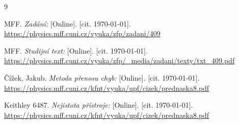 
\begin{thebibliography}{9}

 MFF. \emph{Zadání:} [Online]. [cit. \today]. \newline \url{https://physics.mff.cuni.cz/vyuka/zfp/zadani/409}

 MFF. \emph{Studijní text:} [Online]. [cit. \today]. \newline \url{https://physics.mff.cuni.cz/vyuka/zfp/_media/zadani/texty/txt_409.pdf}

 Čížek, Jakub. \emph{Metoda přenosu chyb:} [Online]. [cit. \today]. \newline \url{https://physics.mff.cuni.cz/kfnt/vyuka/upf/cizek/prednaska8.pdf}

 Keithley 6487. \emph{Nejistota přístroje:} [Online]. [cit. \today]. \newline \url{https://physics.mff.cuni.cz/kfnt/vyuka/upf/cizek/prednaska8.pdf}

\end{thebibliography}
